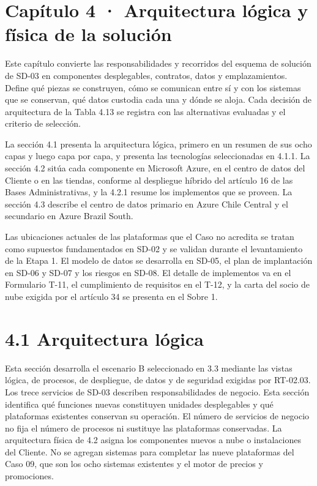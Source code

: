 \documentclass[11pt]{article}
\begin{document}
\tableofcontents
\clearpage

\section{Capítulo 4 · Arquitectura lógica y física de la solución}

Este capítulo convierte las responsabilidades y recorridos del esquema de solución de SD-03 en componentes desplegables, contratos, datos y emplazamientos. Define qué piezas se construyen, cómo se comunican entre sí y con los sistemas que se conservan, qué datos custodia cada una y dónde se aloja. Cada decisión de arquitectura de la Tabla 4.13 se registra con las alternativas evaluadas y el criterio de selección.

La sección 4.1 presenta la arquitectura lógica, primero en un resumen de sus ocho capas y luego capa por capa, y presenta las tecnologías seleccionadas en 4.1.1. La sección 4.2 sitúa cada componente en Microsoft Azure, en el centro de datos del Cliente o en las tiendas, conforme al despliegue híbrido del artículo 16 de las Bases Administrativas, y la 4.2.1 resume los implementos que se proveen. La sección 4.3 describe el centro de datos primario en Azure Chile Central y el secundario en Azure Brazil South.

Las ubicaciones actuales de las plataformas que el Caso no acredita se tratan como supuestos fundamentados en SD-02 y se validan durante el levantamiento de la Etapa 1. El modelo de datos se desarrolla en SD-05, el plan de implantación en SD-06 y SD-07 y los riesgos en SD-08. El detalle de implementos va en el Formulario T-11, el cumplimiento de requisitos en el T-12, y la carta del socio de nube exigida por el artículo 34 se presenta en el Sobre 1.

\section{4.1 Arquitectura lógica}

Esta sección desarrolla el escenario B seleccionado en 3.3 mediante las vistas lógica, de procesos, de despliegue, de datos y de seguridad exigidas por RT-02.03. Los trece servicios de SD-03 describen responsabilidades de negocio. Esta sección identifica qué funciones nuevas constituyen unidades desplegables y qué plataformas existentes conservan su operación. El número de servicios de negocio no fija el número de procesos ni sustituye las plataformas conservadas. La arquitectura física de 4.2 asigna los componentes nuevos a nube o instalaciones del Cliente. No se agregan sistemas para completar las nueve plataformas del Caso 09, que son los ocho sistemas existentes y el motor de precios y promociones.
\end{document}
